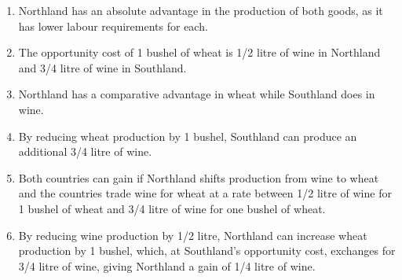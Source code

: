 \begin{enumialphparenastyle}
\begin{econex}
\begin{econsolution}
\begin{enumerate}
\item	Northland has an absolute advantage in the production of both goods, as it has lower labour requirements for each.
\item	The opportunity cost of 1 bushel of wheat is 1/2 litre of wine in Northland and 3/4 litre of wine in Southland.
\item	Northland has a comparative advantage in wheat while Southland does in wine.
\item	By reducing wheat production by 1 bushel, Southland can produce an additional 3/4 litre of wine.
\item	Both countries can gain if Northland shifts production from wine to wheat and the countries trade wine for wheat at a rate between 1/2 litre of wine for 1 bushel of wheat and 3/4 litre of wine for one bushel of wheat.
\item	By reducing wine production by 1/2 litre, Northland can increase wheat production by 1 bushel, which, at Southland's opportunity cost, exchanges for 3/4 litre of wine, giving Northland a gain of 1/4 litre of wine.
\end{enumerate}
\end{econsolution}
\end{econex}


\end{enumialphparenastyle}
